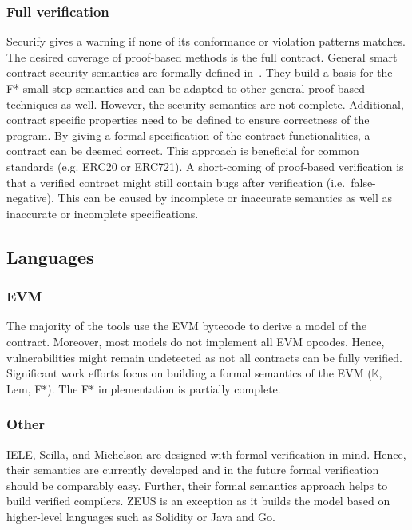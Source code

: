 \subsubsection{Full verification}
Securify gives a warning if none of its conformance or violation patterns matches.
The desired coverage of proof-based methods is the full contract. 
General smart contract security semantics are formally defined in~\cite{Grishchenko2018}. They build a basis for the F* small-step semantics and can be adapted to other general proof-based techniques as well.
However, the security semantics  are not complete.
Additional, contract specific properties need to be defined to ensure correctness of the program.
By giving a formal specification of the contract functionalities, a contract can be deemed correct. This approach is beneficial for common standards (e.g. ERC20 or ERC721). 
A short-coming of proof-based verification is that a verified contract might still contain bugs after verification (i.e.\ false-negative). 
This can be caused by incomplete or inaccurate semantics as well as inaccurate or incomplete specifications.

\subsection{Languages} 
\subsubsection{EVM}
The majority of the tools use the EVM bytecode to derive a model of the contract. Moreover, most models do not implement all EVM opcodes. Hence, vulnerabilities might remain undetected as not all contracts can be fully verified.
Significant work efforts focus on building a formal semantics of the EVM ($\mathbb{K}$, Lem, F*). 
The F* implementation is partially complete. 

\subsubsection{Other}
IELE, Scilla, and Michelson are designed with formal verification in mind. 
Hence, their semantics are currently developed and in the future formal verification should be comparably easy. 
Further, their formal semantics approach helps to build verified compilers.
ZEUS is an exception as it builds the model based on higher-level languages such as Solidity or Java and Go. 

